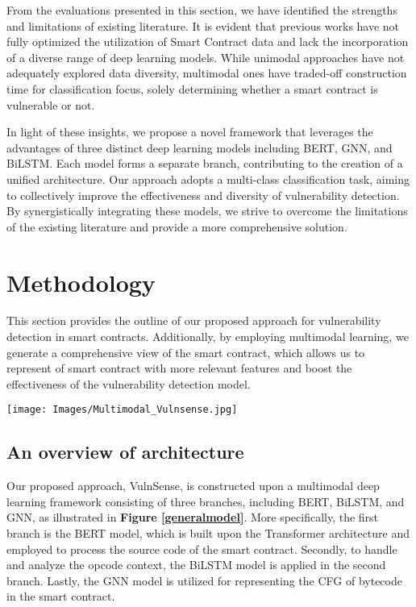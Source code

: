 From the evaluations presented in this section, we have identified the strengths and limitations of existing literature. It is evident that previous works have not fully optimized the utilization of Smart Contract data and lack the incorporation of a diverse range of deep learning models. While unimodal approaches have not adequately explored data diversity, multimodal ones have traded-off construction time for classification focus, solely determining whether a smart contract is vulnerable or not.

In light of these insights, we propose a novel framework that leverages the advantages of three distinct deep learning models including BERT, GNN, and BiLSTM. Each model forms a separate branch, contributing to the creation of a unified architecture. Our approach adopts a multi-class classification task, aiming to collectively improve the effectiveness and diversity of vulnerability detection. By synergistically integrating these models, we strive to overcome the limitations of the existing literature and provide a more comprehensive solution.

\section{Methodology} \label{methodology}
This section provides the outline of our proposed approach for vulnerability detection in smart contracts. Additionally, by employing multimodal learning, we generate a comprehensive view of the smart contract, which allows us to represent of smart contract with more relevant features and boost the effectiveness of the vulnerability detection model.

\begin{figure*}[h]
\centering
\texttt{[image: Images/Multimodal\_Vulnsense.jpg]}
\caption{The overview of VulnSense framework.} \label{generalmodel}
\end{figure*}
 
\subsection{An overview of architecture}
Our proposed approach, VulnSense, is constructed upon a multimodal deep learning framework consisting of three branches, including BERT, BiLSTM, and GNN, as illustrated in \textbf{Figure \ref{generalmodel}}. More specifically, the first branch is the BERT model, which is built upon the Transformer architecture and employed to process the source code of the smart contract. Secondly, to handle and analyze the opcode context, the BiLSTM model is applied in the second branch. Lastly, the GNN model is utilized for representing the CFG of bytecode in the smart contract.

